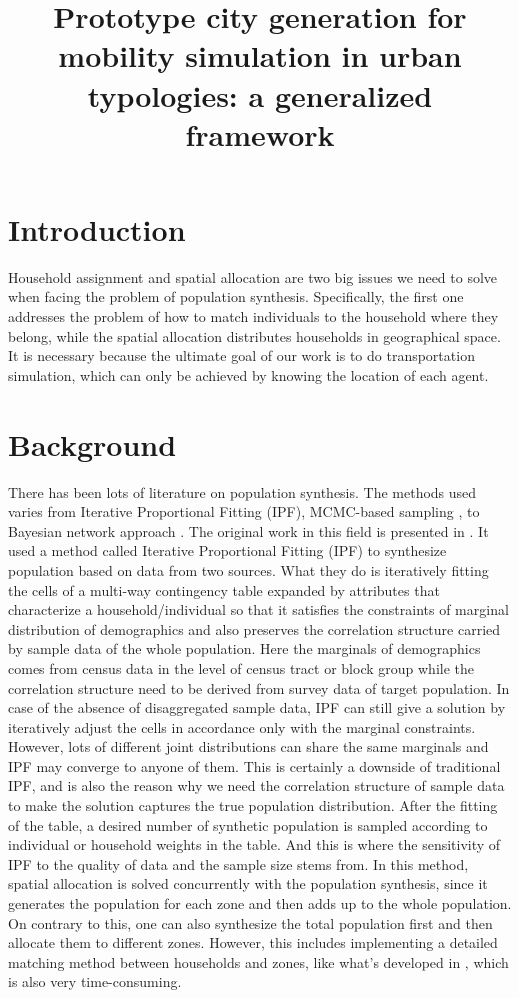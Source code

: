 \documentclass[11pt,twoside]{article}
\numberwithin{equation}{section}
\newcommand{\?}{\stackrel{?}{=}}
\begin{document}
\title{Prototype city generation for mobility simulation in urban typologies: a  generalized framework}
\author{}
\maketitle


\section{Introduction}
Household assignment and spatial allocation are two big issues we need to solve when facing the problem of population synthesis.
Specifically, the first one addresses the problem of how to match individuals to the household where they belong, while the spatial allocation distributes households in geographical space.
It is necessary because the ultimate goal of our work is to do transportation simulation, which can only be achieved by knowing the location of each agent. \\


\section{Background}
There has been lots of literature on population synthesis.
The methods used varies from Iterative Proportional Fitting (IPF), MCMC-based sampling \cite{farooq2013simulation}, to Bayesian network approach \cite{sun2015bayesian}. The original work in this field is presented in \cite{beckman1996creating}. It used a method called Iterative Proportional Fitting (IPF) to synthesize population based on data from two sources. What they do is iteratively fitting the cells of a multi-way contingency table expanded by attributes that characterize a household/individual so that it satisfies the constraints of marginal distribution of demographics and also preserves the correlation structure carried by sample data of the whole population. Here the marginals of demographics comes from census data in the level of census tract or block group while the correlation structure need to be derived from survey data of target population. In case of the absence of disaggregated sample data, IPF can still give a solution by iteratively adjust the cells in accordance only with the marginal constraints. However, lots of different joint distributions can share the same marginals and IPF may converge to anyone of them. This is certainly a downside of traditional IPF, and is also the reason why we need the correlation structure of sample data to make the solution captures the true population distribution. After the fitting of the table, a desired number of synthetic population is sampled according to individual or household weights in the table. And this is where the sensitivity of IPF to the quality of data and the sample size stems from. In this method, spatial allocation is solved concurrently with the population synthesis, since it generates the population for each zone and then adds up to the whole population. On contrary to this, one can also synthesize the total population first and then allocate them to different zones. However, this includes implementing a detailed matching method between households and zones, like what's developed in \cite{ge2014virtual}, which is also very time-consuming. 
\end{document}
